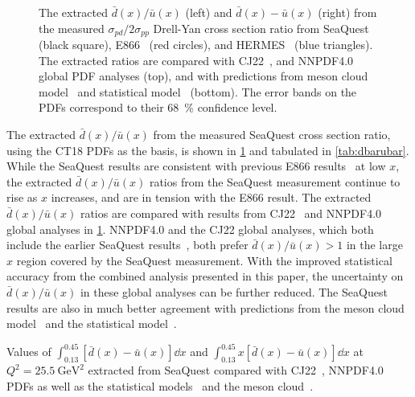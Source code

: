 \documentclass[reprint,aps,unsortedaddress,superscriptaddress,prl,floatfix,showpacs,linenumbers]{revtex4-2}
\begin{document}
\begin{figure}[htpb!]
\begin{subfigure}{0.45\linewidth}
	\end{subfigure}
	\caption{The extracted $\bar{d}(x)/\bar{u}(x)$ (left) and $\bar{d}(x)-\bar{u}(x)$ (right)
		from the measured $\sigma_{pd}/2\sigma_{pp}$ Drell-Yan cross section ratio
		from SeaQuest (black square), E866~\cite{towell2001} (red circles), and HERMES~\cite{ackerstaff1998} (blue triangles).
		The extracted ratios are compared with CJ22~\cite{accardi2023}, and NNPDF4.0~\cite{ball2022a} global PDF analyses (top),
		and with predictions from meson cloud model~\cite{alberg2022} and statistical model~\cite{soffer2019} (bottom).
		The error bands on the PDFs correspond to their \SI{68}{\percent} confidence level.
	}
	\label{fig:e906_e866_dbarubar}
\end{figure}

The extracted $\bar{d}(x)/\bar{u}(x)$ from the measured SeaQuest cross section ratio,
using the CT18 PDFs as the basis, is shown in \cref{fig:e906_e866_dbarubar}
and tabulated in \cref{tab:dbarubar}.
While the SeaQuest results are consistent with previous E866
results~\cite{towell2001} at low $x$,
the extracted $\bar{d}(x)/\bar{u}(x)$ ratios from the SeaQuest measurement
continue to rise as $x$ increases,
and are in tension with the E866 result.
The extracted $\bar{d}(x)/\bar{u}(x)$ ratios are compared with results
from CJ22~\cite{accardi2023} and NNPDF4.0~\cite{ball2022a}
global analyses in \cref{fig:e906_e866_dbarubar}.
NNPDF4.0 and the CJ22 global analyses, which both include the earlier SeaQuest results~\cite{dove2021},
both prefer $\bar{d}(x)/\bar{u}(x)>1$ in the large $x$ region covered by the SeaQuest measurement.
With the improved statistical accuracy from the combined analysis
presented in this paper, the uncertainty on $\bar{d}(x)/\bar{u}(x)$ in
these global analyses can be further reduced.
The SeaQuest results are also in much better agreement with
predictions from the meson cloud model~\cite{alberg2022}
and the statistical model~\cite{soffer2019}.

\begin{table}[htbp!]
	\centering
	\caption{Values of $\int_{0.13}^{0.45} \left[\bar{d}\left(x\right) - \bar{u}\left(x\right)\right] \dd{x}$
		and $\int_{0.13}^{0.45} x\left[\bar{d}\left(x\right) - \bar{u}\left(x\right)\right] \dd{x}$ at $Q^2=\SI{25.5}{\GeV\squared}$ extracted from
		SeaQuest compared with  CJ22~\cite{accardi2023}, NNPDF4.0~\cite{ball2022a}
		PDFs as well as the statistical models~\cite{soffer2019} and the meson cloud~\cite{alberg2022}.}
	\label{tab:dbarMubar}
	\begin{adjustbox}{max width=\linewidth}
		
	\end{adjustbox}
\end{table}
\end{document}

